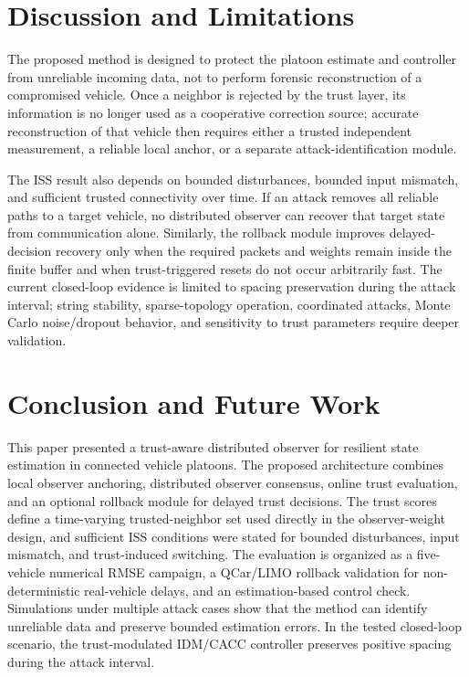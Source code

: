 \documentclass[journal,twoside]{IEEEtran}
\begin{document}

\section{Discussion and Limitations}\label{sec_discussion}
The proposed method is designed to protect the platoon estimate and controller from unreliable incoming data, not to perform forensic reconstruction of a compromised vehicle. Once a neighbor is rejected by the trust layer, its information is no longer used as a cooperative correction source; accurate reconstruction of that vehicle then requires either a trusted independent measurement, a reliable local anchor, or a separate attack-identification module.

The ISS result also depends on bounded disturbances, bounded input mismatch, and sufficient trusted connectivity over time. If an attack removes all reliable paths to a target vehicle, no distributed observer can recover that target state from communication alone. Similarly, the rollback module improves delayed-decision recovery only when the required packets and weights remain inside the finite buffer and when trust-triggered resets do not occur arbitrarily fast. The current closed-loop evidence is limited to spacing preservation during the attack interval; string stability, sparse-topology operation, coordinated attacks, Monte Carlo noise/dropout behavior, and sensitivity to trust parameters require deeper validation.

\section{Conclusion and Future Work}\label{sec_conclusion}
This paper presented a trust-aware distributed observer for resilient state estimation in connected vehicle platoons. The proposed architecture combines local observer anchoring, distributed observer consensus, online trust evaluation, and an optional rollback module for delayed trust decisions. The trust scores define a time-varying trusted-neighbor set used directly in the observer-weight design, and sufficient ISS conditions were stated for bounded disturbances, input mismatch, and trust-induced switching. The evaluation is organized as a five-vehicle numerical RMSE campaign, a QCar/LIMO rollback validation for non-deterministic real-vehicle delays, and an estimation-based control check. Simulations under multiple attack cases show that the method can identify unreliable data and preserve bounded estimation errors. In the tested closed-loop scenario, the trust-modulated IDM/CACC controller preserves positive spacing during the attack interval.
\end{document}
